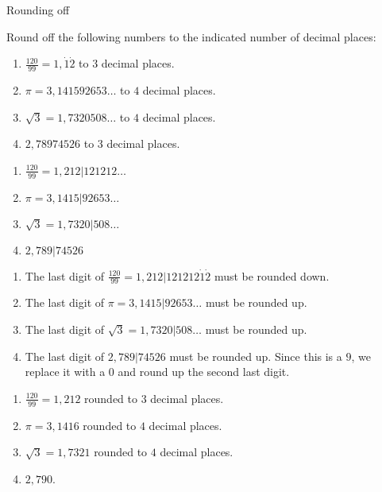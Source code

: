\begin{wex}{Rounding off }

{Round off the following numbers to the indicated number of decimal places: 
\begin{enumerate}[itemsep=5pt, label=\textbf{\arabic*}. ] 

\item $\frac{120}{99}=1,\dot{1}\dot{2}$ to $3$ decimal places.
\item $\pi =3,141592653\ldots$ to $4$ decimal places.
\item $\sqrt{3}=1,7320508\ldots$ to $4$ decimal places.
\item $2,78974526$ to $3$ decimal places.
\end{enumerate}
}
{

\begin{enumerate}[itemsep=5pt, label=\textbf{\arabic*}. ] 
\item $\frac{120}{99}=1,212|121212\ldots$
\item $\pi =3,1415|92653\ldots$
\item $\sqrt{3}=1,7320|508\ldots$
\item $2,789|74526$
\end{enumerate}

\begin{enumerate}[itemsep=5pt, label=\textbf{\arabic*}. ]
\item The last digit of $\frac{120}{99}=1,212|121212\dot{1}\dot{2}$  must be rounded down.
\item The last digit of $\pi =3,1415|92653\ldots$ must be rounded up.
\item The last digit of $\sqrt{3}=1,7320|508\ldots$ must be rounded up.
\item  The last digit of $2,789|74526$ must be rounded up.
\newline Since this is a $9$, we replace it with a $0$ and round up the second last digit.
\end{enumerate}

\begin{enumerate}[itemsep=5pt, label=\textbf{\arabic*}. ]
\item $\frac{120}{99}=1,212$ rounded to $3$ decimal places.
\item $\pi =3,1416$  rounded to $4$ decimal places.
\item $\sqrt{3}=1,7321$ rounded to $4$ decimal places.
\item $2,790$.
\end{enumerate}
}  
\end{wex}



